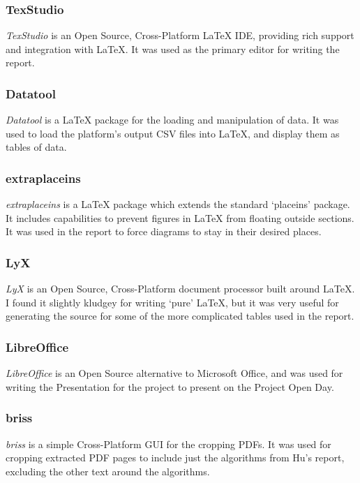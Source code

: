 \documentclass[a4paper,11pt]{report}
\begin{document}
\subsubsection*{TexStudio}
\emph{TexStudio} \citep{prog:texstudio} is an Open Source, Cross-Platform \LaTeX{} IDE, providing rich support and integration with \LaTeX{}. It was used as the primary editor for writing the report.

\subsubsection*{Datatool}
\emph{Datatool} \citep{prog:datatool} is a \LaTeX{} package for the loading and manipulation of data. It was used to load the platform's output CSV files into \LaTeX{}, and display them as tables of data.

\subsubsection*{extraplaceins}
\emph{extraplaceins} \citep{prog:extraplaceins} is a \LaTeX{} package which extends the standard `placeins' package. It includes capabilities to prevent figures in \LaTeX{} from floating outside sections. It was used in the report to force diagrams to stay in their desired places.

\subsubsection*{LyX}
\emph{LyX} \citep{prog:lyx} is an Open Source, Cross-Platform document processor built around \LaTeX{}. I found it slightly kludgey for writing `pure' \LaTeX{}, but it was very useful for generating the source for some of the more complicated tables used in the report. 

\subsubsection*{LibreOffice}
\emph{LibreOffice} \citep{prog:libreoffice} is an Open Source alternative to Microsoft Office, and was used for writing the Presentation for the project to present on the Project Open Day.

\subsubsection*{briss}
\emph{briss} \citep{prog:briss} is a simple Cross-Platform GUI for the cropping PDFs. It was used for cropping extracted PDF pages to include just the algorithms from Hu's report, excluding the other text around the algorithms.
\end{document}
